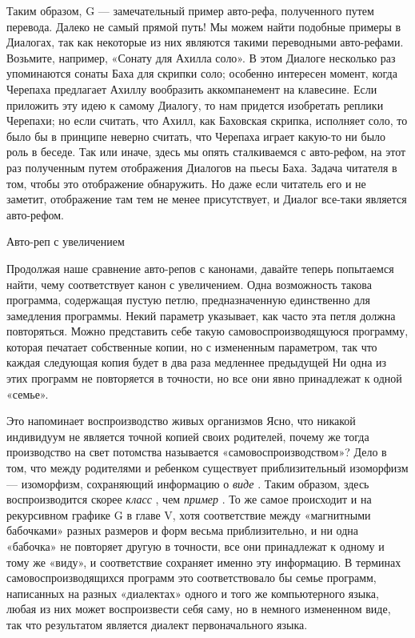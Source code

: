\documentclass[../main.tex]{subfiles}
\begin{document}
Таким образом, G --- замечательный пример авто-рефа, полученного путем перевода. Далеко не самый прямой путь! Мы можем найти подобные примеры в Диалогах, так как некоторые из них являются такими переводными авто-рефами. Возьмите, например, «Сонату для Ахилла соло». В этом Диалоге несколько раз упоминаются сонаты Баха для скрипки соло; особенно интересен момент, когда Черепаха предлагает Ахиллу вообразить аккомпанемент на клавесине. Если приложить эту идею к самому Диалогу, то нам придется изобретать реплики Черепахи; но если считать, что Ахилл, как Баховская скрипка, исполняет соло, то было бы в принципе неверно считать, что Черепаха играет какую-то ни было роль в беседе. Так или иначе, здесь мы опять сталкиваемся с авто-рефом, на этот раз полученным путем отображения Диалогов на пьесы Баха. Задача читателя в том, чтобы это отображение обнаружить. Но даже если читатель его и не заметит, отображение там тем не менее присутствует, и Диалог все-таки является авто-рефом.

Авто-реп с увеличением

Продолжая наше сравнение авто-репов с канонами, давайте теперь попытаемся найти, чему соответствует канон с увеличением. Одна возможность такова программа, содержащая пустую петлю, предназначенную единственно для замедления программы. Некий параметр указывает, как часто эта петля должна повторяться. Можно представить себе такую самовоспроизводящуюся программу, которая печатает собственные копии, но с измененным параметром, так что каждая следующая копия будет в два раза медленнее предыдущей Ни одна из этих программ не повторяется в точности, но все они явно принадлежат к одной «семье».

Это напоминает воспроизводство живых организмов Ясно, что никакой индивидуум не является точной копией своих родителей, почему же тогда производство на свет потомства называется «самовоспроизводством»? Дело в том, что между родителями и ребенком существует приблизительный изоморфизм --- изоморфизм, сохраняющий информацию о \emph{виде} . Таким образом, здесь воспроизводится скорее \emph{класс} , чем \emph{пример} . То же самое происходит и на рекурсивном графике G в главе V, хотя соответствие между «магнитными бабочками» разных размеров и форм весьма приблизительно, и ни одна «бабочка» не повторяет другую в точности, все они принадлежат к одному и тому же «виду», и соответствие сохраняет именно эту информацию. В терминах самовоспроизводящихся программ это соответствовало бы семье программ, написанных на разных «диалектах» одного и того же компьютерного языка, любая из них может воспроизвести себя саму, но в немного измененном виде, так что результатом является диалект первоначального языка.
\end{document}
